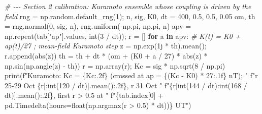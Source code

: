 \documentclass[
  10pt,
  a4paper,
]{article}
\newenvironment{Shaded}{}{}
\newcommand{\BuiltInTok}[1]{#1}
\newcommand{\CommentTok}[1]{\textit{#1}}
\newcommand{\ControlFlowTok}[1]{\textbf{#1}}
\newcommand{\DecValTok}[1]{#1}
\newcommand{\FloatTok}[1]{#1}
\newcommand{\KeywordTok}[1]{\textbf{#1}}
\newcommand{\NormalTok}[1]{#1}
\newcommand{\OperatorTok}[1]{#1}
\newcommand{\OtherTok}[1]{#1}
\newcommand{\SpecialCharTok}[1]{#1}
\newcommand{\SpecialStringTok}[1]{#1}
\newcommand{\StringTok}[1]{#1}
\begin{document}
\begin{Shaded}
\begin{Highlighting}[]
\CommentTok{\# {-}{-}{-} Section 2 calibration: Kuramoto ensemble whose coupling is driven by the field}
\NormalTok{rng }\OperatorTok{=}\NormalTok{ np.random.default\_rng(}\DecValTok{1}\NormalTok{)}\OperatorTok{;}\NormalTok{ n, sig, K0, dt }\OperatorTok{=} \DecValTok{400}\NormalTok{, }\FloatTok{0.5}\NormalTok{, }\FloatTok{0.5}\NormalTok{, }\FloatTok{0.05}
\NormalTok{om, th }\OperatorTok{=}\NormalTok{ rng.normal(}\DecValTok{0}\NormalTok{, sig, n), rng.uniform(}\OperatorTok{{-}}\NormalTok{np.pi, np.pi, n)}
\NormalTok{apv }\OperatorTok{=}\NormalTok{ np.repeat(tab[}\StringTok{"ap"}\NormalTok{].values, }\BuiltInTok{int}\NormalTok{(}\DecValTok{3} \OperatorTok{/}\NormalTok{ dt))}\OperatorTok{;}\NormalTok{ r }\OperatorTok{=}\NormalTok{ []}
\ControlFlowTok{for}\NormalTok{ a }\KeywordTok{in}\NormalTok{ apv:                     }\CommentTok{\# K(t) = K0 + ap(t)/27 ; mean{-}field Kuramoto step}
\NormalTok{    z }\OperatorTok{=}\NormalTok{ np.exp(}\OtherTok{1j} \OperatorTok{*}\NormalTok{ th).mean()}\OperatorTok{;}\NormalTok{ r.append(}\BuiltInTok{abs}\NormalTok{(z))}
\NormalTok{    th }\OperatorTok{=}\NormalTok{ th }\OperatorTok{+}\NormalTok{ dt }\OperatorTok{*}\NormalTok{ (om }\OperatorTok{+}\NormalTok{ (K0 }\OperatorTok{+}\NormalTok{ a }\OperatorTok{/} \DecValTok{27}\NormalTok{) }\OperatorTok{*} \BuiltInTok{abs}\NormalTok{(z) }\OperatorTok{*}\NormalTok{ np.sin(np.angle(z) }\OperatorTok{{-}}\NormalTok{ th))}
\NormalTok{r }\OperatorTok{=}\NormalTok{ np.array(r)}\OperatorTok{;}\NormalTok{ Kc }\OperatorTok{=}\NormalTok{ sig }\OperatorTok{*}\NormalTok{ np.sqrt(}\DecValTok{8} \OperatorTok{/}\NormalTok{ np.pi)}
\BuiltInTok{print}\NormalTok{(}\SpecialStringTok{f"Kuramoto: Kc = }\SpecialCharTok{\{}\NormalTok{Kc}\SpecialCharTok{:.2f\}}\SpecialStringTok{ (crossed at ap = }\SpecialCharTok{\{}\NormalTok{(Kc }\OperatorTok{{-}}\NormalTok{ K0) }\OperatorTok{*} \DecValTok{27}\SpecialCharTok{:.1f\}}\SpecialStringTok{ nT); "}
      \SpecialStringTok{f"r 25{-}29 Oct }\SpecialCharTok{\{}\NormalTok{r[:}\BuiltInTok{int}\NormalTok{(}\DecValTok{120} \OperatorTok{/}\NormalTok{ dt)]}\SpecialCharTok{.}\NormalTok{mean()}\SpecialCharTok{:.2f\}}\SpecialStringTok{, r 31 Oct "}
      \SpecialStringTok{f"}\SpecialCharTok{\{}\NormalTok{r[}\BuiltInTok{int}\NormalTok{(}\DecValTok{144} \OperatorTok{/}\NormalTok{ dt):}\BuiltInTok{int}\NormalTok{(}\DecValTok{168} \OperatorTok{/}\NormalTok{ dt)]}\SpecialCharTok{.}\NormalTok{mean()}\SpecialCharTok{:.2f\}}\SpecialStringTok{, first r \textgreater{} 0.5 at "}
      \SpecialStringTok{f"}\SpecialCharTok{\{}\NormalTok{tab}\SpecialCharTok{.}\NormalTok{index[}\DecValTok{0}\NormalTok{] }\OperatorTok{+}\NormalTok{ pd}\SpecialCharTok{.}\NormalTok{Timedelta(hours}\OperatorTok{=}\BuiltInTok{float}\NormalTok{(np.argmax(r }\OperatorTok{\textgreater{}} \FloatTok{0.5}\NormalTok{) }\OperatorTok{*}\NormalTok{ dt))}\SpecialCharTok{\}}\SpecialStringTok{ UT"}\NormalTok{)}
\end{Highlighting}
\end{Shaded}
\end{document}
